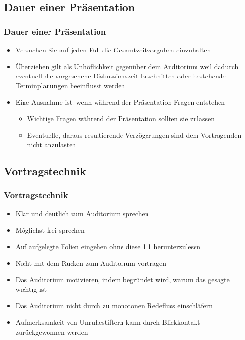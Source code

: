 \documentclass{beamer}
\begin{document}
\subsection{Dauer einer Präsentation}
\begin{frame}
\frametitle{Dauer einer Präsentation}
\begin{itemize}
\item Versuchen Sie auf jeden Fall die Gesamtzeitvorgaben einzuhalten
\item Überziehen gilt als Unhöflichkeit gegenüber dem Auditorium weil dadurch eventuell die  vorgesehene Diskussionszeit beschnitten oder bestehende Terminplanungen beeinflusst werden
\item Eine Ausnahme ist, wenn während der Präsentation Fragen entstehen
\begin{itemize}
\item Wichtige Fragen während der Präsentation sollten sie zulassen
\item Eventuelle, daraus resultierende Verzögerungen sind dem Vortragenden nicht anzulasten
\end{itemize}
\end{itemize}
\end{frame}

\subsection{Vortragstechnik}
\begin{frame}
\frametitle{Vortragstechnik}
\begin{itemize}
\item Klar und deutlich zum Auditorium sprechen
\item Möglichst frei sprechen
\item Auf aufgelegte Folien eingehen ohne diese 1:1 herunterzulesen
\item Nicht mit dem Rücken zum Auditorium vortragen
\item Das Auditorium motivieren, indem begründet wird, warum das gesagte wichtig ist
\item Das Auditorium nicht durch zu monotonen Redefluss einschläfern
\item Aufmerksamkeit von Unruhestiftern kann durch Blickkontakt zurückgewonnen werden
\end{itemize}
\end{frame}
\end{document}
